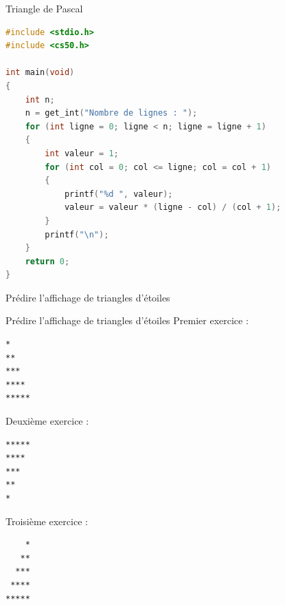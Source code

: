 \begin{UPSTIprofOnlyEnv}
    \begin{UPSTIcorrectionP}{Triangle de Pascal}
        \begin{lstlisting}[language=C]
#include <stdio.h>
#include <cs50.h>

int main(void)
{
    int n;
    n = get_int("Nombre de lignes : ");
    for (int ligne = 0; ligne < n; ligne = ligne + 1)
    {
        int valeur = 1;
        for (int col = 0; col <= ligne; col = col + 1)
        {
            printf("%d ", valeur);
            valeur = valeur * (ligne - col) / (col + 1);
        }
        printf("\n");
    }
    return 0;
}
        \end{lstlisting}
    \end{UPSTIcorrectionP}
\end{UPSTIprofOnlyEnv}


\begin{UPSTIexercice}{Prédire l'affichage de triangles d'étoiles}
\end{UPSTIexercice}

\begin{UPSTIprofOnlyEnv}
    \begin{UPSTIcorrectionP}{Prédire l'affichage de triangles d'étoiles}
        Premier exercice :
        \begin{verbatim}
*
**
***
****
*****
        \end{verbatim}
        Deuxième exercice :
        \begin{verbatim}
*****
****
***
**
*
        \end{verbatim}
        Troisième exercice :
        \begin{verbatim}
    *
   **
  ***
 ****
*****
        \end{verbatim}
    \end{UPSTIcorrectionP}
\end{UPSTIprofOnlyEnv}


